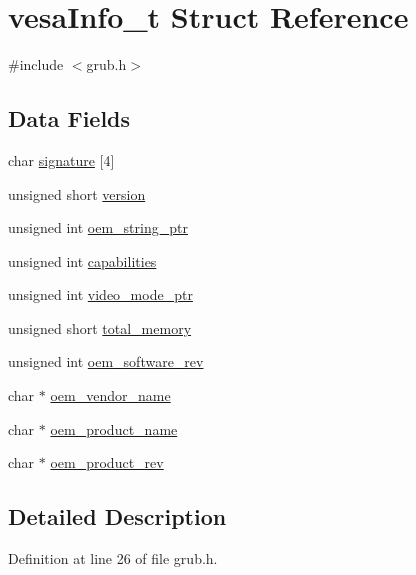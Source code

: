 \hypertarget{structvesaInfo__t}{\section{vesa\+Info\+\_\+t Struct Reference}
\label{structvesaInfo__t}
}


{\ttfamily \#include $<$grub.\+h$>$}

\subsection*{Data Fields}
\begin{DoxyCompactItemize}
\item 
char \hyperlink{structvesaInfo__t_a48deedd69aeb2ce0d1c27e77f9da23c5}{signature} \mbox{[}4\mbox{]}
\item 
unsigned short \hyperlink{structvesaInfo__t_a6c1001f337933e02a68640cfc7abdfb6}{version}
\item 
unsigned int \hyperlink{structvesaInfo__t_aee5b0eb81a986dc3adadc287dd6809c4}{oem\+\_\+string\+\_\+ptr}
\item 
unsigned int \hyperlink{structvesaInfo__t_a1f4453c48c6629e27fd2e97948deb62b}{capabilities}
\item 
unsigned int \hyperlink{structvesaInfo__t_af4342c2c5c65c802e4a042d324572b9d}{video\+\_\+mode\+\_\+ptr}
\item 
unsigned short \hyperlink{structvesaInfo__t_ab94cc102e07cdfbf3cb53690bf205321}{total\+\_\+memory}
\item 
unsigned int \hyperlink{structvesaInfo__t_af0e5f50889726f62d961141ee8fa06f3}{oem\+\_\+software\+\_\+rev}
\item 
char $\ast$ \hyperlink{structvesaInfo__t_a35b0e91dc1f97ab1f05b8c9a6fe8988f}{oem\+\_\+vendor\+\_\+name}
\item 
char $\ast$ \hyperlink{structvesaInfo__t_a532306633838e6bc58a9e91f69835302}{oem\+\_\+product\+\_\+name}
\item 
char $\ast$ \hyperlink{structvesaInfo__t_a4df6ee9c56e2171999b8346550e2273f}{oem\+\_\+product\+\_\+rev}
\end{DoxyCompactItemize}


\subsection{Detailed Description}


Definition at line 26 of file grub.\+h.



